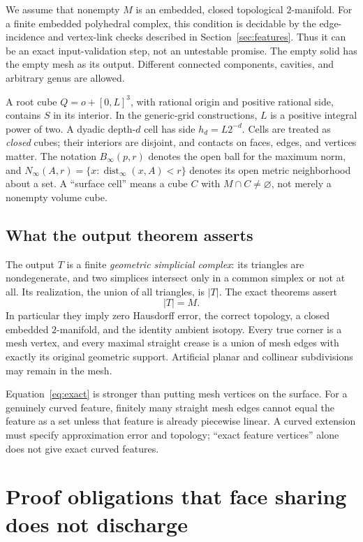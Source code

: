 \documentclass[11pt]{article}
\theoremstyle{definition}
\theoremstyle{remark}
\newcommand{\dist}{\operatorname{dist}}
\newcommand{\Binf}[2]{B_\infty(#1,#2)}
\newcommand{\Ninf}[2]{N_\infty(#1,#2)}
\begin{document}
We assume that nonempty $M$ is an embedded, closed topological $2$-manifold.
For a finite embedded polyhedral complex, this condition is decidable by the
edge-incidence and vertex-link checks described in Section~\ref{sec:features}.
Thus it can be an exact input-validation step, not an untestable promise.
The empty solid has the empty mesh as its output. Different connected
components, cavities, and arbitrary genus are allowed.

A root cube $Q=o+[0,L]^3$, with rational origin and positive rational side,
contains $S$ in its interior. In the generic-grid constructions, $L$ is a
positive integral power of two. A dyadic depth-$d$ cell has side
$h_d=L2^{-d}$. Cells are treated as \emph{closed} cubes; their interiors are
disjoint, and contacts on faces, edges, and vertices matter.
The notation $\Binf{p}{r}$ denotes the open ball for the maximum norm,
and $\Ninf{A}{r}=\{x:\dist_\infty(x,A)<r\}$ denotes its open metric
neighborhood about a set. A ``surface cell'' means a cube $C$ with
$M\cap C\ne\varnothing$, not merely a nonempty volume cube.

\subsection{What the output theorem asserts}

The output $T$ is a finite \emph{geometric simplicial complex}: its triangles
are nondegenerate, and two simplices intersect only in a common simplex or
not at all. Its realization, the union of all triangles, is $|T|$.
The exact theorems assert
\[
  |T|=M. \tag{1}\label{eq:exact}
\]
In particular they imply zero Hausdorff error, the correct topology, a
closed embedded $2$-manifold, and the identity ambient isotopy. Every true
corner is a mesh vertex, and every maximal straight crease is a union of
mesh edges with exactly its original geometric support. Artificial planar
and collinear subdivisions may remain in the mesh.

Equation~\eqref{eq:exact} is stronger than putting mesh vertices on the
surface. For a genuinely curved feature, finitely many straight mesh edges
cannot equal the feature as a set unless that feature is already piecewise
linear. A curved extension must specify approximation error and topology;
``exact feature vertices'' alone does not give exact curved features.

\section{Proof obligations that face sharing does not discharge}
\label{sec:obligations}
\end{document}
